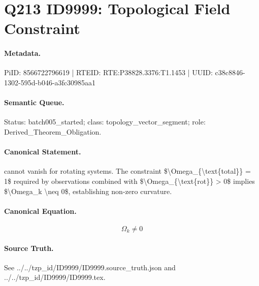 \section*{Q213 ID9999: Topological Field Constraint}
\paragraph{Metadata.}
PiID: 8566722796619 | RTEID: RTE:P38828.3376:T1.1453 | UUID: c38c8846-1302-595d-b046-a3fc30985aa1

\paragraph{Semantic Queue.}
Status: batch005\_started; class: topology\_vector\_segment; role: Derived\_Theorem\_Obligation.

\paragraph{Canonical Statement.}
cannot vanish for rotating systems. The constraint \$\textbackslash{}Omega\_\{\textbackslash{}text\{total\}\} = 1\$ required by observations combined with \$\textbackslash{}Omega\_\{\textbackslash{}text\{rot\}\} > 0\$ implies \$\textbackslash{}Omega\_k \textbackslash{}neq 0\$, establishing non-zero curvature.

\paragraph{Canonical Equation.}
\[
\Omega_k \neq 0
\]

\paragraph{Source Truth.}
See ../../tzp\_id/ID9999/ID9999.source\_truth.json and ../../tzp\_id/ID9999/ID9999.tex.
